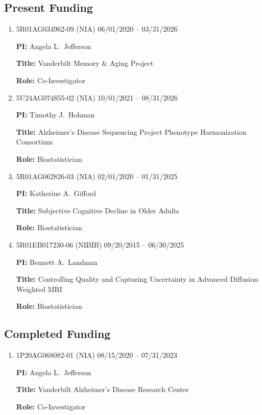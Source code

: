 \documentclass[12pt]{article}
\begin{document}
	\subsection*{Present Funding}
	\begin{enumerate}
		
		\item 5R01AG034962-09 (NIA) \hfill 06/01/2020 -- 03/31/2026
		
		{\bf PI:} Angela L.\ Jefferson
		
		{\bf Title:} Vanderbilt Memory \& Aging Project
		
		{\bf Role:} Co-Investigator
		\item 5U24AG074855-02 (NIA) \hfill 10/01/2021 -- 08/31/2026
		
		{\bf PI:} Timothy J.\ Hohman
		
		{\bf Title:} Alzheimer's Disease Sequencing Project Phenotype Harmonization Consortium
		
		{\bf Role:} Biostatistician
		\item 5R01AG062826-03 (NIA) \hfill 02/01/2020 -- 01/31/2025
		
		{\bf PI:} Katherine A.\ Gifford
		
		{\bf Title:} Subjective Cognitive Decline in Older Adults
		
		{\bf Role:} Biostatistician
		
		\item 5R01EB017230-06 (NIBIB) \hfill 09/20/2015 -- 06/30/2025
		
		{\bf PI:} Bennett A.\ Landman
		
		{\bf Title:} Controlling Quality and Capturing Uncertainty 
		in Advanced Diffusion Weighted MRI
		
		{\bf Role:} Biostatistician
	\end{enumerate}

	\subsection*{Completed Funding}
	\begin{enumerate}
		
		\item 1P20AG068082-01 (NIA) \hfill 08/15/2020 -- 07/31/2023
		
		{\bf PI:} Angela L.\ Jefferson
		
		{\bf Title:} Vanderbilt Alzheimer's Disease Research Center
		
		{\bf Role:} Co-Investigator
	\end{enumerate}
	
\end{document}
